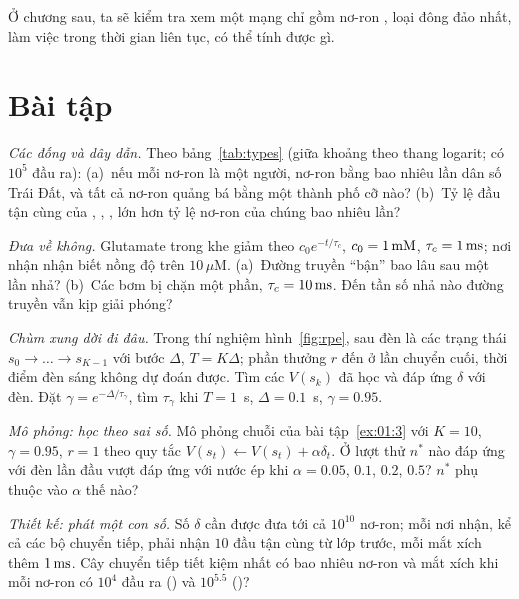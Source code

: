 Ở chương sau, ta sẽ kiểm tra xem một mạng chỉ gồm nơ-ron , loại đông đảo nhất, làm việc trong thời gian liên tục, có thể tính được gì.

\section{Bài tập}

\begin{exercise}[\lvlA]
\label{ex:01:1}
\emph{Các đống và dây dẫn.} Theo bảng~\ref{tab:types} (giữa khoảng theo thang logarit;  có $10^5$ đầu ra): (a)~nếu mỗi nơ-ron là một người, nơ-ron  bằng bao nhiêu lần dân số Trái Đất, và tất cả nơ-ron quảng bá bằng một thành phố cỡ nào? (b)~Tỷ lệ đầu tận cùng của , , ,  lớn hơn tỷ lệ nơ-ron của chúng bao nhiêu lần?
\end{exercise}

\begin{exercise}[\lvlA]
\label{ex:01:2}
\emph{Đưa về không.} Glutamate trong khe giảm theo $c_0e^{-t/\tau_c}$, $c_0=1\,\text{mM}$, $\tau_c=1\,\text{ms}$; nơi nhận nhận biết nồng độ trên $10\,\mu\text{M}$. (a)~Đường truyền ``bận'' bao lâu sau một lần nhả? (b)~Các bơm bị chặn một phần, $\tau_c=10\,\text{ms}$. Đến tần số nhả nào đường truyền vẫn kịp giải phóng?
\end{exercise}

\begin{exercise}[\lvlB]
\label{ex:01:3}
\emph{Chùm xung dời đi đâu.} Trong thí nghiệm hình~\ref{fig:rpe}, sau đèn là các trạng thái $s_0\to\dots\to s_{K-1}$ với bước $\Delta$, $T=K\Delta$; phần thưởng $r$ đến ở lần chuyển cuối, thời điểm đèn sáng không dự đoán được. Tìm các $V(s_k)$ đã học và đáp ứng $\delta$ với đèn. Đặt $\gamma=e^{-\Delta/\tau_\gamma}$, tìm $\tau_\gamma$ khi $T=1$~s, $\Delta=0.1$~s, $\gamma=0.95$.
\end{exercise}

\begin{exercise}[\lvlB]
\label{ex:01:4}
\emph{Mô phỏng: học theo sai số.} Mô phỏng chuỗi của bài tập~\ref{ex:01:3} với $K=10$, $\gamma=0.95$, $r=1$ theo quy tắc $V(s_t)\leftarrow V(s_t)+\alpha\delta_t$. Ở lượt thử $n^*$ nào đáp ứng với đèn lần đầu vượt đáp ứng với nước ép khi $\alpha=0.05$, $0.1$, $0.2$, $0.5$? $n^*$ phụ thuộc vào $\alpha$ thế nào?
\end{exercise}

\begin{exercise}[\lvlB]
\label{ex:01:5}
\emph{Thiết kế: phát một con số.} Số $\delta$ cần được đưa tới cả $10^{10}$ nơ-ron; mỗi nơi nhận, kể cả các bộ chuyển tiếp, phải nhận $10$ đầu tận cùng từ lớp trước, mỗi mắt xích thêm $1\,\text{ms}$. Cây chuyển tiếp tiết kiệm nhất có bao nhiêu nơ-ron và mắt xích khi mỗi nơ-ron có $10^4$ đầu ra () và $10^{5.5}$ ()?
\end{exercise}


